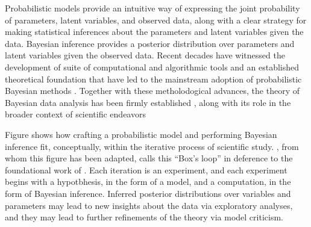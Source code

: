 Probabilistic models provide an intuitive way of expressing the
joint probability of parameters, latent variables, and observed 
data, along with a clear strategy for making statistical inferences 
about the parameters and latent variables given the data. Bayesian
inference provides a posterior distribution
 over parameters and latent variables given the observed data. 
Recent decades have witnessed the development of suite of computational 
and algorithmic tools and an established theoretical foundation 
that have led to the mainstream adoption of probabilistic Bayesian 
methods \cite{bishop2006pattern, murphy2012probabilistic}. Together with these
metholodogical advances, the theory of Bayesian data analysis 
has been firmly established \cite{gelman2014bayesian}, along with its role 
in the broader context of scientific endeavors \cite{gelman2013philosophy, blei2014build}

Figure   shows how crafting a probabilistic model and
performing Bayesian inference fit, conceptually, within the iterative
process of scientific study. \citet{blei2014build}, from whom this
figure has been adapted, calls this ``Box's loop'' in deference to the
foundational work of \citet{box1980sampling}. Each iteration is an 
experiment, and each experiment begins with a hypotbhesis, in the 
form of a model, and a computation, in the form of Bayesian inference.
Inferred posterior distributions over variables and parameters may 
lead to new insights about the data via exploratory analyses, and 
they may lead to further refinements of the theory via model criticism.







